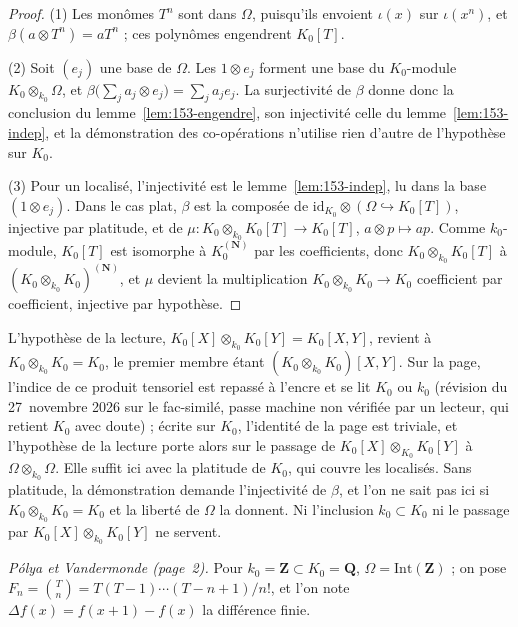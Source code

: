 \begin{proof}
(1) Les monômes $T^n$ sont dans $\Omega$, puisqu'ils envoient $\iota(x)$ sur $\iota(x^n)$, et $\beta(a \otimes T^n) = a T^n$ ; ces polynômes engendrent $K_0[T]$.

(2) Soit $(e_j)$ une base de $\Omega$. Les $1 \otimes e_j$ forment une base du $K_0$-module $K_0 \otimes_{k_0} \Omega$, et $\beta\bigl(\sum_j a_j \otimes e_j\bigr) = \sum_j a_j e_j$. La surjectivité de $\beta$ donne donc la conclusion du lemme~\ref{lem:153-engendre}, son injectivité celle du lemme~\ref{lem:153-indep}, et la démonstration des co-opérations n'utilise rien d'autre de l'hypothèse sur $K_0$.

(3) Pour un localisé, l'injectivité est le lemme~\ref{lem:153-indep}, lu dans la base $(1 \otimes e_j)$. Dans le cas plat, $\beta$ est la composée de $\mathrm{id}_{K_0} \otimes (\Omega \hookrightarrow K_0[T])$, injective par platitude, et de $\mu : K_0 \otimes_{k_0} K_0[T] \to K_0[T]$, $a \otimes p \mapsto ap$. Comme $k_0$-module, $K_0[T]$ est isomorphe à $K_0^{(\mathbf N)}$ par les coefficients, donc $K_0 \otimes_{k_0} K_0[T]$ à $(K_0 \otimes_{k_0} K_0)^{(\mathbf N)}$, et $\mu$ devient la multiplication $K_0 \otimes_{k_0} K_0 \to K_0$ coefficient par coefficient, injective par hypothèse.
\end{proof}

\begin{remarque}
L'hypothèse de la lecture, $K_0[X] \otimes_{k_0} K_0[Y] = K_0[X, Y]$, revient à $K_0 \otimes_{k_0} K_0 = K_0$, le premier membre étant $(K_0 \otimes_{k_0} K_0)[X, Y]$. Sur la page, l'indice de ce produit tensoriel est repassé à l'encre et se lit $K_0$ ou $k_0$ (révision du 27~novembre 2026 sur le fac-similé, passe machine non vérifiée par un lecteur, qui retient $K_0$ avec doute) ; écrite sur $K_0$, l'identité de la page est triviale, et l'hypothèse de la lecture porte alors sur le passage de $K_0[X] \otimes_{K_0} K_0[Y]$ à $\Omega \otimes_{k_0} \Omega$. Elle suffit ici avec la platitude de $K_0$, qui couvre les localisés. Sans platitude, la démonstration demande l'injectivité de $\beta$, et l'on ne sait pas ici si $K_0 \otimes_{k_0} K_0 = K_0$ et la liberté de $\Omega$ la donnent. Ni l'inclusion $k_0 \subset K_0$ ni le passage par $K_0[X] \otimes_{k_0} K_0[Y]$ ne servent.
\end{remarque}

\medskip
\noindent\textit{Pólya et Vandermonde (page~2).} Pour $k_0 = \mathbf Z \subset K_0 = \mathbf Q$, $\Omega = \mathrm{Int}(\mathbf Z)$ ; on pose $F_n = \binom{T}{n} = T(T-1)\cdots(T-n+1)/n!$, et l'on note $\Delta f(x) = f(x+1) - f(x)$ la différence finie.

